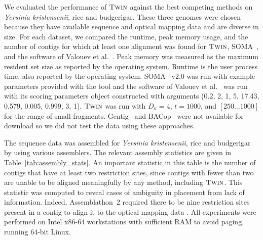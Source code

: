 We evaluated the performance of $\mbox{\rm \textsc{Twin}}$ against the best competing methods on \emph{Yersinia kristensenii}, rice and budgerigar.  These three genomes were chosen because they have available sequence and optical mapping data and are diverse in size.   For each dataset, we compared the runtime, peak memory usage, and the number of contigs for which at least one alignment was found for $\mbox{\rm \textsc{Twin}}$, SOMA~\cite{Nagarajan08}, and the software of Valouev et al.~\cite{Valouev06}.  Peak memory was measured as the maximum resident set size as reported by the operating system.  Runtime is the user process time, also reported by the operating system.   SOMA~\cite{Nagarajan08} v2.0 was run with example parameters provided with the tool and the software of Valouev et al.~\cite{Valouev06} was run with its scoring parameters object constructed with arguments (0.2, 2, 1, 5, 17.43, 0.579, 0.005, 0.999, 3, 1). $\mbox{\rm \textsc{Twin}} $ was run with $D_\sigma = 4$, $t = 1000$, and $[250 \ldots 1000]$ for the range of small fragments.
Gentig~\cite{Anantharaman01} and BACop~\cite{Zhou09} were not available for download so we did not test the data using these approaches.

The sequence data was assembled for  \emph{Yersinia kristensenii}, rice and budgerigar by using various assemblers.
The relevant assembly statistics are given in Table~\ref{tab:assembly_stats}.  An important statistic in this table is the number of contigs that have at least two restriction sites, since contigs with fewer than two are unable to be aligned meaningfully by any method, including $\mbox{\rm \textsc{Twin}}$.  This statistic was computed to reveal cases of ambiguity in placement from lack of information. Indeed, Assemblathon~2 required there to be nine restriction sites present in a contig to align it to the optical mapping data \cite{bradnam2013assemblathon}.  All experiments were performed on Intel x86-64 workstations with sufficient RAM to avoid paging, running  64-bit Linux.

\begin{table}[h]
  \centering
  \caption{Assembly and genome statistics for \emph{Yersinia kristensenii}, rice and budgerigar.  The assembly statistics were obtained from Quast. \cite{quast}.}

\label{tab:assembly_stats}
\end{table}



